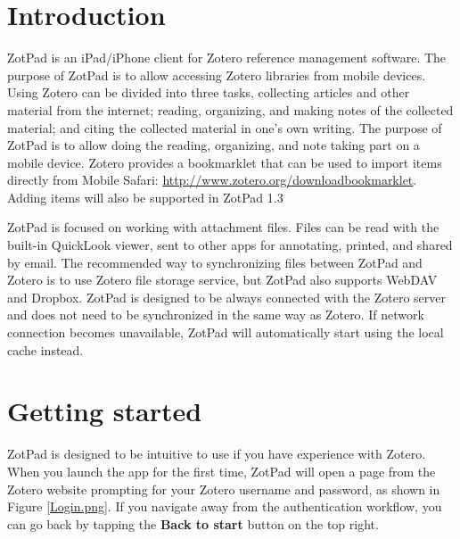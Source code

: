\documentclass[oneside, openany, 12pt]{tufte-book}
\author{Version 1.2}
\newcommand{\iphone}[1]{#1}
\newcommand{\ipadfootnote}[1]{}
\newcommand{\iphone}[1]{}
\newcommand{\ipadfootnote}[1]{\footnote{#1}}
\begin{document}
\maketitle

\tableofcontents


\chapter{Introduction}




ZotPad is an iPad/iPhone client for Zotero reference management software. The purpose of ZotPad is to allow accessing Zotero libraries from mobile devices. Using Zotero can be divided into three tasks, collecting articles and other material from the internet; reading, organizing, and making notes of the collected material; and citing the collected material in one's own writing. The purpose of ZotPad is to allow doing the reading, organizing, and note taking part on a mobile device\ipadfootnote{Zotero provides a bookmarklet that can be used to import items directly from Mobile Safari: \url{http://www.zotero.org/downloadbookmarklet}. Adding items will also be supported in ZotPad 1.3}. \iphone{Zotero provides a bookmarklet that can be used to import items directly from Mobile Safari: \url{http://www.zotero.org/downloadbookmarklet}. Adding items will also be supported in ZotPad 1.3}

ZotPad is focused on working with attachment files. Files can be read with the built-in QuickLook viewer, sent to other apps for annotating, printed, and shared by email. The recommended way to synchronizing files between ZotPad and Zotero is to use Zotero file storage service, but ZotPad also supports WebDAV and Dropbox. ZotPad is designed to be always connected with the Zotero server and does not need to be synchronized in the same way as Zotero. If network connection becomes unavailable, ZotPad will automatically start using the local cache instead.

\chapter{Getting started}

ZotPad is designed to be intuitive to use if you have experience with Zotero. When you launch the app for the first time, ZotPad will open a page from the Zotero website prompting for your Zotero username and password, as shown in Figure \ref{Login.png}. If you navigate away from the authentication workflow, you can go back by tapping the \textbf{Back to start} button on the top right.
\end{document}
